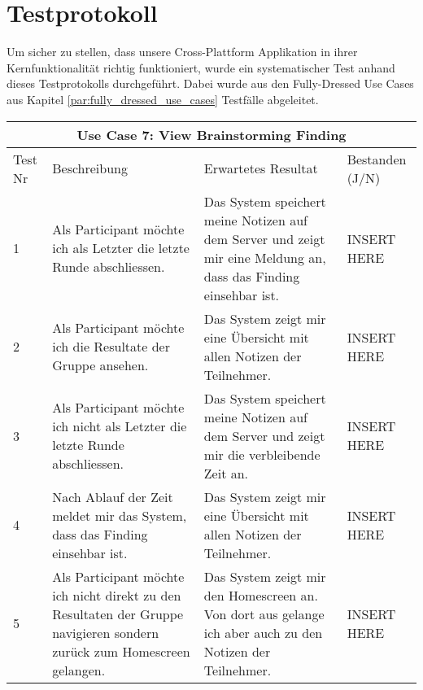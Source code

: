 \section{Testprotokoll}

Um sicher zu stellen, dass unsere Cross-Plattform Applikation in ihrer Kernfunktionalität richtig funktioniert, wurde ein systematischer Test anhand dieses Testprotokolls durchgeführt. Dabei wurde aus den Fully-Dressed Use Cases aus Kapitel \ref{par:fully_dressed_use_cases} Testfälle abgeleitet.

\renewcommand{\arraystretch}{1.35}
\begin{center}
	\begin{longtable}{| p{1cm} | p{5cm} | p{5cm} | p{2cm} |}
		\hline
		\multicolumn{4}{|c|}{\textbf{Use Case 7: View Brainstorming Finding}}\\
		\hline\hline
		Test Nr & Beschreibung & Erwartetes Resultat & Bestanden (J/N) \\
		\hline
		1 & Als Participant möchte ich als Letzter die letzte Runde abschliessen. & Das System speichert meine Notizen auf dem Server und zeigt mir eine Meldung an, dass das Finding einsehbar ist. & INSERT HERE \\
		\hline
		2 & Als Participant möchte ich die Resultate der Gruppe ansehen. & Das System zeigt mir eine Übersicht mit allen Notizen der Teilnehmer. & INSERT HERE\\
		\hline
		3 & Als Participant möchte ich nicht als Letzter die letzte Runde abschliessen. & Das System speichert meine Notizen auf dem Server und zeigt mir die verbleibende Zeit an. & INSERT HERE\\
		\hline
		4 & Nach Ablauf der Zeit meldet mir das System, dass das Finding einsehbar ist. & Das System zeigt mir eine Übersicht mit allen Notizen der Teilnehmer. & INSERT HERE \\
		\hline
		5 & Als Participant möchte ich nicht direkt zu den Resultaten der Gruppe navigieren sondern zurück zum Homescreen gelangen. & Das System zeigt mir den Homescreen an. Von dort aus gelange ich aber auch zu den Notizen der Teilnehmer. & INSERT HERE  \\
		\hline
	\end{longtable}
\end{center}


